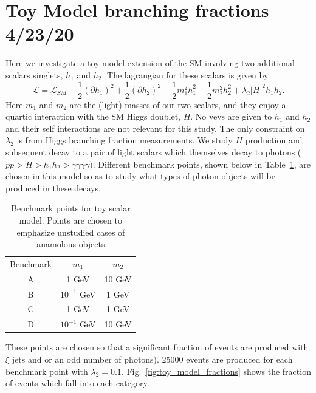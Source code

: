 \documentclass[aps,onecolumn,twoside,secnumarabic,balancelastpage,amsmath,amssymb,nofootinbib,hyperref=pdftex]{revtex4}
\begin{document}
\section{Toy Model branching fractions \tiny{4/23/20}}
Here we investigate a toy model extension of the SM involving two additional scalars singlets, $h_{1}$ and $h_{2}$. The lagrangian for these scalars is given by
\begin{equation}
\mathcal{L} = \mathcal{L}_{SM} + \frac{1}{2}(\partial h_{1})^{2} + \frac{1}{2}(\partial h_{2})^{2} - \frac{1}{2}m_{1}^{2}h_{1}^{2} -\frac{1}{2}m_{2}^{2}h_{2}^{2} + \lambda_{2}|H|^{2}h_{1}h_{2}.
\end{equation}
Here $m_{1}$ and $m_{2}$ are the (light) masses of our two scalars, and they enjoy a quartic interaction with the SM Higgs doublet, $H$. No vevs are given to $h_{1}$ and $h_{2}$ and their self interactions are not relevant for this study. The only constraint on $\lambda_{2}$ is from Higgs branching fraction measurements. We study $H$ production and subsequent decay to a pair of light scalars which themselves decay to photons ($ p p > H > h_{1} h_{2} > \gamma\gamma\gamma\gamma)$. Different benchmark points, shown below in Table~\ref{table:bench}, are chosen in this model so as to study what types of photon objects will be produced in these decays.
\begin{table}[htp]
\caption{Benchmark points for toy scalar model. Points are chosen to emphasize unstudied cases of anamolous objects}
\begin{center}
\begin{tabular}{c|c|c}
Benchmark & $m_{1}$ & $m_{2}$\\
A & 1 GeV & 10 GeV\\
B & $10^{-1}$ GeV & 1 GeV\\
C & 1 GeV & 1 GeV\\
D & $10^{-1}$ GeV & 10 GeV\\
\end{tabular}
\end{center}
\label{table:bench}
\end{table}
These points are chosen so that a significant fraction of events are produced with $\xi$ jets and or an odd number of photons). 25000 events are produced for each benchmark point with $\lambda_{2} = 0.1$. Fig.~\ref{fig:toy_model_fractions} shows the fraction of events which fall into each category. 
\end{document}
